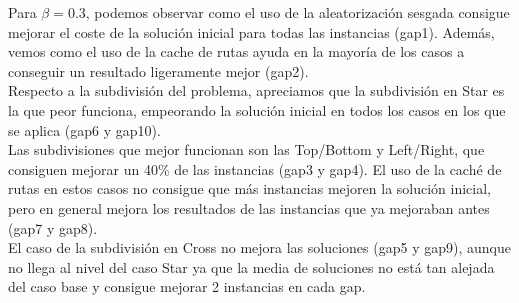 \documentclass[11pt]{article} %
\begin{document}
\begin{enumerate}
Para $\beta = 0.3$, podemos observar como el uso de la aleatorización sesgada consigue mejorar el coste de la solución inicial para todas las instancias (gap1). Además, vemos como el uso de la cache de rutas ayuda en la mayoría de los casos a conseguir un resultado ligeramente mejor (gap2).\\
Respecto a la subdivisión del problema, apreciamos que la subdivisión en Star es la que peor funciona, empeorando la solución inicial en todos los casos en los que se aplica (gap6 y gap10). \\
Las subdivisiones que mejor funcionan son las Top/Bottom y Left/Right, que consiguen mejorar un 40\% de las instancias (gap3 y gap4). El uso de la caché de rutas en estos casos no consigue que más instancias mejoren la solución inicial, pero en general mejora los resultados de las instancias que ya mejoraban antes (gap7 y gap8).\\
El caso de la subdivisión en Cross no mejora las soluciones (gap5 y gap9), aunque no llega al nivel del caso Star ya que la media de soluciones no está tan alejada del caso base y consigue mejorar 2 instancias en cada gap.

\clearpage


\end{enumerate}
\end{document}
